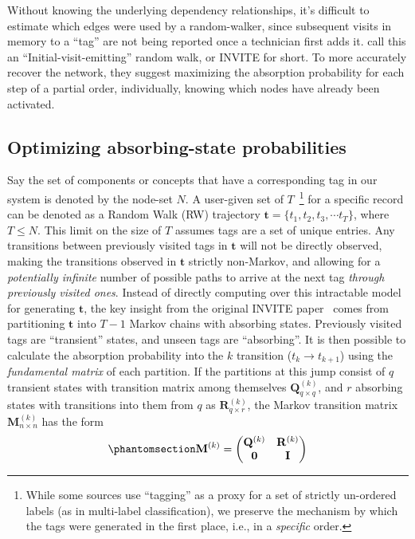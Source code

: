\documentclass[%
	12pt,
		oneside,
		letterpaper
]{book}
\begin{document}
Without knowing the underlying dependency relationships, it's difficult to estimate which edges were used by a random-walker, since subsequent visits in memory to a ``tag'' are not being reported once a technician first adds it.
\autocite{Humanmemorysearch_Jun2015} call this an ``Initial-visit-emitting'' random walk, or INVITE for short.
To more accurately recover the network, they suggest maximizing the absorption probability for each step of a partial order, individually, knowing which nodes have already been activated.

\subsection{Optimizing absorbing-state probabilities}\label{optimizing-absorbing-state-probabilities}

Say the set of components or concepts that have a corresponding tag in our system is denoted by the node-set \(N\).
A user-given set of \(T\)~\footnote{While some sources use ``tagging'' as a proxy for a set of strictly
  un-ordered labels (as in multi-label classification), we preserve
  the mechanism by which the tags were generated in the first place,
  i.e., in a \emph{specific} order.} for a specific record can be denoted as a Random Walk (RW) trajectory \(\mathbf{t}=\{t_1, t_2, t_3, \cdots t_{T}\}\), where \(T\leq N\).
This limit on the size of \(T\) assumes tags are a set of unique entries.
Any transitions between previously visited tags in \(\mathbf{t}\) will not be directly observed, making the transitions observed in \(\mathbf{t}\) strictly non-Markov, and allowing for a \emph{potentially infinite} number of possible paths to arrive at the next tag \emph{through previously visited ones}.
Instead of directly computing over this intractable model for generating \(\mathbf{t}\), the key insight from the original INVITE paper~\autocite{Humanmemorysearch_Jun2015} comes from partitioning \(\mathbf{t}\) into \(T-1\) Markov chains with absorbing states.
Previously visited tags are ``transient'' states, and unseen tags are ``absorbing''.
It is then possible to calculate the absorption probability into the \(k\) transition (\(t_k \rightarrow t_{k+1}\)) using the \emph{fundamental matrix} of each partition.
If the partitions at this jump consist of \(q\) transient states with transition matrix among themselves \(\mathbf{Q}^{(k)}_{q\times q}\), and \(r\) absorbing states with transitions into them from \(q\) as \(\mathbf{R}^{(k)}_{q\times r}\), the Markov transition matrix \(\mathbf{M}^{(k)}_{n\times n}\) has the form
\begin{equation}\phantomsection\label{eq-trans-matrix}{
\mathbf{M}^{(k)} =
    \begin{pmatrix}
        \mathbf{Q}^{(k)}  & \mathbf{R}^{(k)} \\
        \mathbf{0}        & \mathbf{I}
    \end{pmatrix}
}\end{equation}
\end{document}
